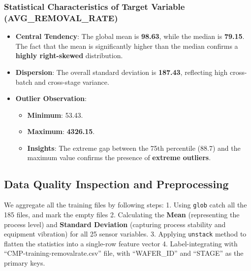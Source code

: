 \documentclass[11pt]{article}
\providecommand{\tightlist}{%
      \setlength{\itemsep}{0pt}\setlength{\parskip}{0pt}}
\begin{document}
\subsubsection{Statistical Characteristics of Target Variable
(AVG\_REMOVAL\_RATE)}\label{statistical-characteristics-of-target-variable-avg_removal_rate}

\begin{itemize}
\tightlist
\item
  \textbf{Central Tendency}: The global mean is \textbf{98.63}, while
  the median is \textbf{79.15}. The fact that the mean is significantly
  higher than the median confirms a \textbf{highly right-skewed}
  distribution.
\item
  \textbf{Dispersion}: The overall standard deviation is
  \textbf{187.43}, reflecting high cross-batch and cross-stage variance.
\item
  \textbf{Outlier Observation}:

  \begin{itemize}
  \tightlist
  \item
    \textbf{Minimum}: 53.43.
  \item
    \textbf{Maximum}: \textbf{4326.15}.
  \item
    \textbf{Insights}: The extreme gap between the 75th percentile
    (88.7) and the maximum value confirms the presence of
    \textbf{extreme outliers}.
  \end{itemize}
\end{itemize}

    \subsection{Data Quality Inspection and
Preprocessing}\label{data-quality-inspection-and-preprocessing}

    We aggregate all the training files by following steps: 1. Using
\texttt{glob} catch all the 185 files, and mark the empty files 2.
Calculating the \textbf{Mean} (representing the process level) and
\textbf{Standard Deviation} (capturing process stability and equipment
vibration) for all 25 sensor variables. 3. Applying \texttt{unstack}
method to flatten the statistics into a single-row feature vector 4.
Label-integrating with ``CMP-training-removalrate.csv'' file, with
``WAFER\_ID'' and ``STAGE'' as the primary keys.
\end{document}
